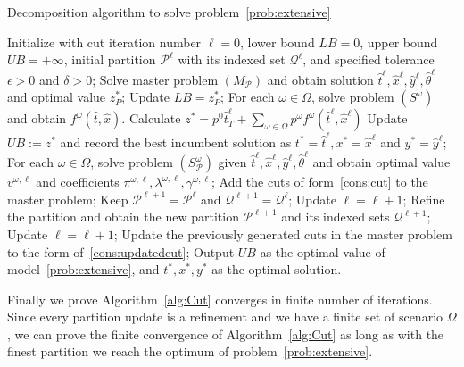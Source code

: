 \documentclass[11pt]{article}
\newcommand{\noi}{\noindent}
\begin{document}
	\begin{algorithm}[H]
		\caption{Decomposition algorithm to solve problem~\eqref{prob:extensive}}
		\label{alg:Cut}
		\begin{algorithmic}[1]
			\State Initialize with cut iteration number \(\ell = 0\), lower bound \(LB = 0\), upper bound \(UB = +\infty\), initial partition \(\mathcal{P}^\ell\) with its indexed set \(\mathcal{Q}^\ell\), and specified tolerance \(\epsilon > 0\) and \(\delta > 0\);
			\State Solve master problem \((M_{\mathcal{P}})\) and obtain solution \(\hat{t}^{\ell}, \hat{x}^{\ell}, \hat{y}^{\ell}, \hat{\theta}^{\ell}\) and optimal value \(z_{P}^*\);
			\State Update \(LB = z_{P}^*\);
			\EndIf
			\State For each \(\omega \in \Omega\), solve problem \((S^\omega)\) and obtain \(f^{\omega}(\hat{t},\hat{x})\). 
			\State Calculate \(z^* = p^0 \hat{t}^\ell_T + \sum_{\omega \in \Omega} p^\omega f^{\omega}(\hat{t}^\ell,\hat{x}^\ell)\)
			\State Update \(UB := z^*\) and record the best incumbent solution as \(t^* = \hat{t}^\ell, x^* = \hat{x}^\ell\) and \(y^* = \hat{y}^\ell\);
			\EndIf
			\State For each \(\omega \in \Omega\), solve problem \((S_{\mathcal{P}}^\omega)\) given \(\hat{t}^{\ell}, \hat{x}^{\ell}, \hat{y}^{\ell}, \hat{\theta}^{\ell}\) and obtain optimal value \(v^{\omega,\ell}\) and coefficients \(\pi^{\omega,\ell}, \lambda^{\omega,\ell}, \gamma^{\omega,\ell}\);
			\State Add the cuts of form~\eqref{cons:cut} to the master problem;
			\State Keep \(\mathcal{P}^{\ell + 1} = \mathcal{P}^\ell\) and \(\mathcal{Q}^{\ell + 1} = \mathcal{Q}^\ell\); 
			\State Update \(\ell = \ell + 1\);
			\Else
			\State Refine the partition and obtain the new partition \(\mathcal{P}^{\ell + 1}\) and its indexed sets \(\mathcal{Q}^{\ell + 1}\);
			\State Update \(\ell = \ell + 1\);
			\State Update the previously generated cuts in the master problem to the form of~\eqref{cons:updatedcut};
			\EndIf
			\vspace{0.1cm}
			\State Output \(UB\) as the optimal value of model~\eqref{prob:extensive}, and \(t^*, x^*,y^*\) as the optimal solution.
		\end{algorithmic}
	\end{algorithm}
	\noi Finally we prove Algorithm~\ref{alg:Cut} converges in finite number of iterations. Since every partition update is a refinement and we have a finite set of scenario \(\Omega\), we can prove the finite convergence of Algorithm~\ref{alg:Cut} as long as with the finest partition we reach the optimum of problem~\eqref{prob:extensive}.
\end{document}
